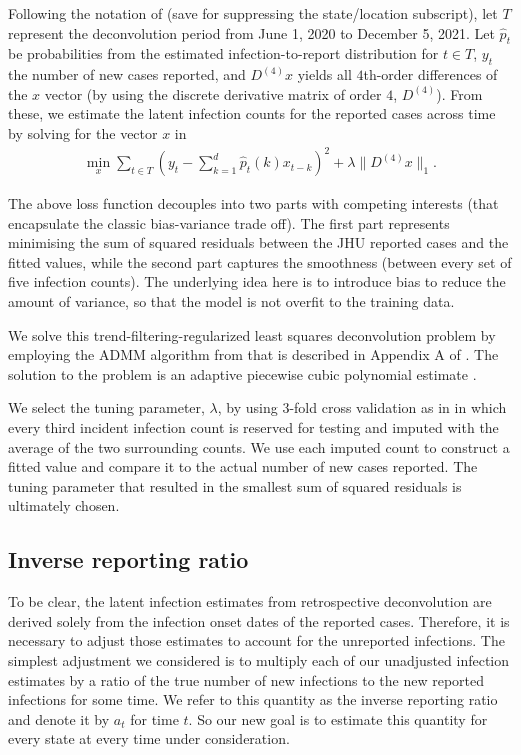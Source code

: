 \documentclass{article}
\begin{document}
Following the notation of \citet{jahja2022real} (save for suppressing the state/location subscript), let $T$ represent the deconvolution period from June 1, 2020 to December 5, 2021. Let $\hat{p}_t$ be probabilities from the estimated infection-to-report distribution for $t \in T$, $y_t$ the number of new cases reported, and $D^{(4)}x$ yields all $4$th-order differences of the $x$ vector (by using the discrete derivative matrix of order $4$, $D^{(4)}$). From these, we estimate the latent infection counts for the reported cases across time by solving for the vector $x$ in
\begin{align*}
\min_{x} \sum_{t \in T} \left ( y_t -  \sum_{k = 1}^{d} \hat{p}_t(k)x_{t-k} \right )^2 + \lambda \|D^{(4)}x\|_1. 
\end{align*}

The above loss function decouples into two parts with competing interests (that encapsulate the classic bias-variance trade off). The first part represents minimising the sum of squared residuals between the JHU reported cases and the fitted values, while the second part captures the smoothness (between every set of five infection counts). The underlying idea here is to introduce bias to reduce the amount of variance, so that the model is not overfit to the training data.

We solve this trend-filtering-regularized least squares deconvolution problem by employing the ADMM algorithm from \citet{ramdas2016fast} that is described in Appendix A of \citet{jahja2022real}. The solution to the problem is an adaptive piecewise cubic polynomial estimate \citep{tibshirani2014adaptive, tibshirani2022divided}.

We select the tuning parameter, $\lambda$, by using $3$-fold cross validation as in \citet{jahja2022real} in which every third incident infection count is reserved for testing and imputed with the average of the two surrounding counts. We use each imputed count to construct a fitted value and compare it to the actual number of new cases reported. The tuning parameter that resulted in the smallest sum of squared residuals is ultimately chosen.

\subsection{Inverse reporting ratio} To be clear, the latent infection estimates from retrospective deconvolution are derived solely from the infection onset dates of the reported cases. Therefore, it is necessary to adjust those estimates to account for the unreported infections. The simplest adjustment we considered is to multiply each of our unadjusted infection estimates by a ratio of the true number of new infections to the new reported infections for some time. We refer to this quantity as the inverse reporting ratio and denote it by $a_t$ for time $t$. So our new goal is to estimate this quantity for every state at every time under consideration.
\end{document}
